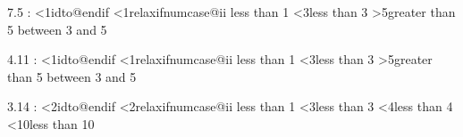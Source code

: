 \documentclass{article}
\makeatletter
\def\ifnumcase#1{%
			\edef\elseif@{\string\elseif}\edef\endif@{\string\endif}%
			\def\number@test{#1pt}\ifnumcase@i%
		}
\def\ifnumcase@i#1{%
			\def\ifnumcase@ii##1{%
				\csname
					@\ifdim\number@test#1pt first\else second\fi oftwo%
				\endcsname{##1\gobto@endif}\ifnumcase@i%
			}%
			\edef\valeur@{\string#1}%
			\csname
				\ifx\valeur@\elseif@ idto@endif%
				\else\ifx\valeur@\endif@ relax\else ifnumcase@ii\fi
				\fi
			\endcsname%
		}
\def\gobto@endif#1\endif{}
\makeatother
\begin{document}
7.5 : \ifnumcase{7.5}%
	{<1}{less than 1}
	{<3}{less than 3}
	{>5}{greater than 5}
\elseif
	between 3 and 5%
\endif

4.11 : \ifnumcase{4.11}%
	{<1}{less than 1}
	{<3}{less than 3}
	{>5}{greater than 5}
\elseif
	between 3 and 5%
\endif

3.14 : \ifnumcase{3.14}%
	{<2}{less than 1}
	{<3}{less than 3}
	{<4}{less than 4}
	{<10}{less than 10}
\endif
\end{document}
